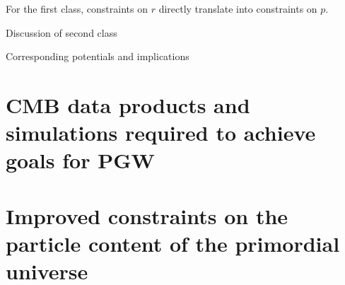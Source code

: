 For the first class, constraints on $r$ directly translate into constraints on $p$.

Discussion of second class

Corresponding potentials and implications

\section{CMB data products and simulations required to achieve goals for PGW}
\label{sec:needs}

\section{Improved constraints on the particle content of the primordial universe}
\label{sec:scalar}

